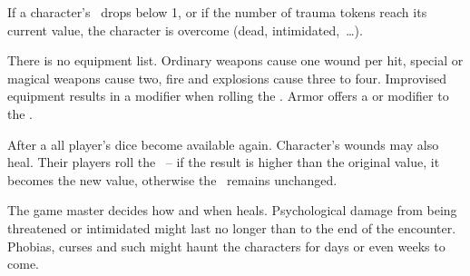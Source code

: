 {		If a character's \HD~drops below 1, or if the number of trauma tokens reach its current value, the character is overcome (dead, intimidated,~\ldots).


		\noindent
		There is no equipment list. Ordinary weapons cause one wound per hit, special or magical weapons cause two, fire and explosions cause three to four. Improvised equipment results in a  modifier when rolling the \AD. Armor offers a  or  modifier to the \RD.


		\noindent
		After a  all player's dice become available again. Character's wounds may also heal. Their players roll the \HD\ -- if the result is higher than the original value, it becomes the new value, otherwise the \HD\ remains unchanged.

		The game master decides how and when  heals. Psychological damage from being threatened or intimidated might last no longer than to the end of the encounter. Phobias, curses and such might haunt the characters for days or even weeks to come.
}

